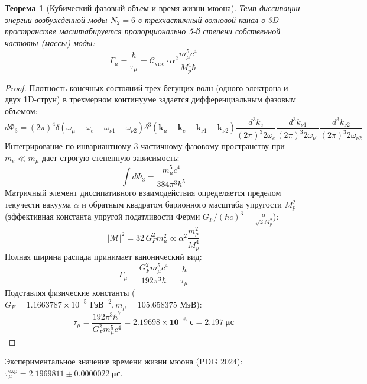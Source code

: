 \documentclass[12pt,a4paper]{article}
\newtheorem{theorem}{Теорема}
\begin{document}
\begin{theorem}[Кубический фазовый объем и время жизни мюона]
	Темп диссипации энергии возбужденной моды $N_2=6$ в трехчастичный волновой канал в 3D-пространстве масштабируется пропорционально 5-й степени собственной частоты (массы) моды:
	\begin{equation}
		\Gamma_\mu = \frac{\hbar}{\tau_\mu} = \mathcal{C}_{\mathrm{visc}} \cdot \alpha^2 \frac{m_\mu^5 c^4}{M_p^4 \hbar}
	\end{equation}
\end{theorem}

\begin{proof}
	Плотность конечных состояний трех бегущих волн (одного электрона и двух 1D-струн) в трехмерном континууме задается дифференциальным фазовым объемом:
	\begin{equation}
		d\Phi_3 = (2\pi)^4 \delta\left( \omega_\mu - \omega_e - \omega_{\nu 1} - \omega_{\nu 2} \right) \delta^3\left( \mathbf{k}_\mu - \mathbf{k}_e - \mathbf{k}_{\nu 1} - \mathbf{k}_{\nu 2} \right) \frac{d^3k_e}{(2\pi)^3 2\omega_e} \frac{d^3k_{\nu 1}}{(2\pi)^3 2\omega_{\nu 1}} \frac{d^3k_{\nu 2}}{(2\pi)^3 2\omega_{\nu 2}}
	\end{equation}
	Интегрирование по инвариантному 3-частичному фазовому пространству при $m_e \ll m_\mu$ дает строгую степенную зависимость:
	\begin{equation}
		\int d\Phi_3 = \frac{m_\mu^5 c^4}{384 \pi^3 \hbar^5}
	\end{equation}
	Матричный элемент диссипативного взаимодействия определяется пределом текучести вакуума $\alpha$ и обратным квадратом барионного масштаба упругости $M_p^2$ (эффективная константа упругой податливости Ферми $G_F / (\hbar c)^3 = \frac{\alpha}{\sqrt{2} M_p^2}$):
	\begin{equation}
		|\mathcal{M}|^2 = 32 \, G_F^2 m_\mu^2 \propto \alpha^2 \frac{m_\mu^2}{M_p^4}
	\end{equation}
	Полная ширина распада принимает канонический вид:
	\begin{equation}
		\Gamma_\mu = \frac{G_F^2 m_\mu^5 c^4}{192 \pi^3 \hbar} = \frac{\hbar}{\tau_\mu}
	\end{equation}
	Подставляя физические константы ($G_F = 1.1663787 \times 10^{-5} \text{ ГэВ}^{-2}, m_\mu = 105.658375 \text{ МэВ}$):
	\begin{equation}
		\tau_\mu = \frac{192 \pi^3 \hbar^7}{G_F^2 m_\mu^5 c^4} = \mathbf{2.19698 \times 10^{-6} \text{ с}} = \mathbf{2.197 \ \mu\text{с}}
	\end{equation}
\end{proof}
Экспериментальное значение времени жизни мюона (PDG 2024):\\ $\tau_\mu^{\text{exp}} = \mathbf{2.1969811 \pm 0.0000022 \ \mu\text{с}}$.
\end{document}
